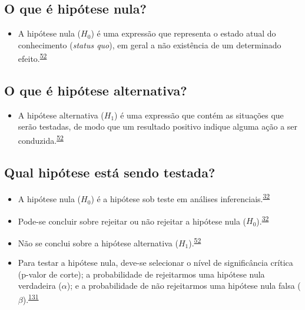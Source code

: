 \documentclass[
]{book}
\providecommand{\tightlist}{%
  \setlength{\itemsep}{0pt}\setlength{\parskip}{0pt}}
\begin{document}
\hypertarget{o-que-uxe9-hipuxf3tese-nula}{%
\subsection{O que é hipótese nula?}\label{o-que-uxe9-hipuxf3tese-nula}}

\begin{itemize}
\tightlist
\item
  A hipótese nula (\(H_{0}\)) é uma expressão que representa o estado atual do conhecimento (\emph{status quo}), em geral a não existência de um determinado efeito.\textsuperscript{\protect\hyperlink{ref-kanji2006}{52}}
\end{itemize}

\hypertarget{o-que-uxe9-hipuxf3tese-alternativa}{%
\subsection{O que é hipótese alternativa?}\label{o-que-uxe9-hipuxf3tese-alternativa}}

\begin{itemize}
\tightlist
\item
  A hipótese alternativa (\(H_{1}\)) é uma expressão que contém as situações que serão testadas, de modo que um resultado positivo indique alguma ação a ser conduzida.\textsuperscript{\protect\hyperlink{ref-kanji2006}{52}}
\end{itemize}

\hypertarget{qual-hipuxf3tese-estuxe1-sendo-testada}{%
\subsection{Qual hipótese está sendo testada?}\label{qual-hipuxf3tese-estuxe1-sendo-testada}}

\begin{itemize}
\item
  A hipótese nula (\(H_{0}\)) é a hipótese sob teste em análises inferenciais.\textsuperscript{\protect\hyperlink{ref-Ali2016}{32}}
\item
  Pode-se concluir sobre rejeitar ou não rejeitar a hipótese nula (\(H_{0}\)).\textsuperscript{\protect\hyperlink{ref-Ali2016}{32}}
\item
  Não se conclui sobre a hipótese alternativa (\(H_{1}\)).\textsuperscript{\protect\hyperlink{ref-kanji2006}{52}}
\item
  Para testar a hipótese nula, deve-se selecionar o nível de significância crítica (p-valor de corte); a probabilidade de rejeitarmos uma hipótese nula verdadeira (\(\alpha\)); e a probabilidade de não rejeitarmos uma hipótese nula falsa (\(\beta\)).\textsuperscript{\protect\hyperlink{ref-Curran-Everett2009}{131}}
\end{itemize}
\end{document}
